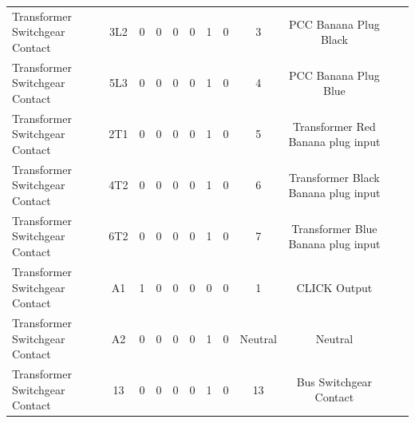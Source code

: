 \begin{table}[!htp]
{\begin{tabular}{lcccccccccll}
			Transformer Switchgear Contact  & 3L2                     & 0                                           & 0                                          & 0           & 0           & 1            & 0                & 3       & PCC Banana Plug Black               &                                                   \\
			Transformer Switchgear Contact  & 5L3                     & 0                                           & 0                                          & 0           & 0           & 1            & 0                & 4       & PCC Banana Plug Blue                &                                                   \\
			Transformer Switchgear Contact  & 2T1                     & 0                                           & 0                                          & 0           & 0           & 1            & 0                & 5       & Transformer Red Banana plug input   &                                                   \\
			Transformer Switchgear Contact  & 4T2                     & 0                                           & 0                                          & 0           & 0           & 1            & 0                & 6       & Transformer Black Banana plug input &                                                   \\
			Transformer Switchgear Contact  & 6T2                     & 0                                           & 0                                          & 0           & 0           & 1            & 0                & 7       & Transformer Blue Banana plug input  &                                                   \\
			Transformer Switchgear Contact  & A1                      & 1                                           & 0                                          & 0           & 0           & 0            & 0                & 1       & CLICK Output                        &                                                   \\
			Transformer Switchgear Contact  & A2                      & 0                                           & 0                                          & 0           & 0           & 1            & 0                & Neutral & Neutral                             &                                                   \\
			Transformer Switchgear Contact  & 13                      & 0                                           & 0                                          & 0           & 0           & 1            & 0                & 13      & Bus Switchgear Contact              &                                                   \\

\end{tabular}}
\end{table}
